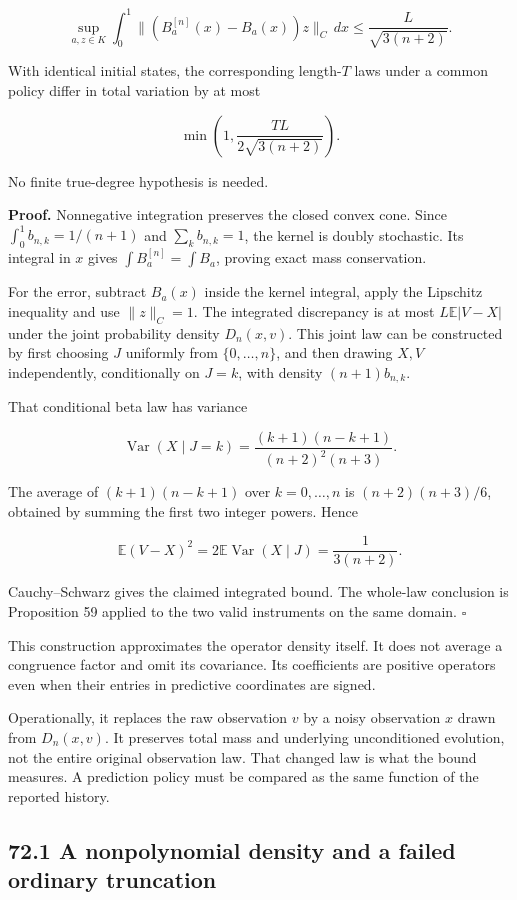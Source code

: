 \[
\boxed{
\sup_{a,z\in K}\int_0^1
\|(B_a^{[n]}(x)-B_a(x))z\|_C\,dx
\leq\frac{L}{\sqrt{3(n+2)}}.
}
\]

With identical initial states, the corresponding length-\(T\) laws under
a common policy differ in total variation by at most

\[
\boxed{\min\left(1,\frac{TL}{2\sqrt{3(n+2)}}\right).}
\]

No finite true-degree hypothesis is needed.

\textbf{Proof.} Nonnegative integration preserves the closed convex
cone. Since \(\int_0^1b_{n,k}=1/(n+1)\) and \(\sum_k b_{n,k}=1\), the
kernel is doubly stochastic. Its integral in \(x\) gives
\(\int B_a^{[n]}=\int B_a\), proving exact mass conservation.

For the error, subtract \(B_a(x)\) inside the kernel integral, apply the
Lipschitz inequality and use \(\|z\|_C=1\). The integrated discrepancy
is at most \(L\mathbb E|V-X|\) under the joint probability density
\(D_n(x,v)\). This joint law can be constructed by first choosing \(J\)
uniformly from \(\{0,\ldots,n\}\), and then drawing \(X,V\)
independently, conditionally on \(J=k\), with density \((n+1)b_{n,k}\).

That conditional beta law has variance

\[
\operatorname{Var}(X\mid J=k)
=\frac{(k+1)(n-k+1)}{(n+2)^2(n+3)}.
\]

The average of \((k+1)(n-k+1)\) over \(k=0,\ldots,n\) is
\((n+2)(n+3)/6\), obtained by summing the first two integer powers.
Hence

\[
\mathbb E(V-X)^2
=2\mathbb E\operatorname{Var}(X\mid J)
=\frac1{3(n+2)}.
\]

Cauchy--Schwarz gives the claimed integrated bound. The whole-law
conclusion is Proposition 59 applied to the two valid instruments on the
same domain. \(\square\)

This construction approximates the operator density itself. It does not
average a congruence factor and omit its covariance. Its coefficients
are positive operators even when their entries in predictive coordinates
are signed.

Operationally, it replaces the raw observation \(v\) by a noisy
observation \(x\) drawn from \(D_n(x,v)\). It preserves total mass and
underlying unconditioned evolution, not the entire original observation
law. That changed law is what the bound measures. A prediction policy
must be compared as the same function of the reported history.

\subsection{72.1 A nonpolynomial density and a failed ordinary
truncation}\label{LSM:a-nonpolynomial-density-and-a-failed-ordinary-truncation}

